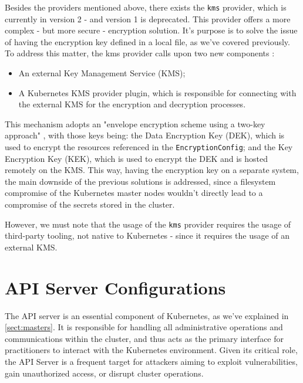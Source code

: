 \documentclass[a4paper,11pt,openright,BCOR=15mm]{scrbook}
\begin{document}
Besides the providers mentioned above, there exists the \texttt{kms} provider, which is currently in version 2 - and version 1 is deprecated. This provider offers a more complex - but more secure - encryption solution. It's purpose is to solve the issue of having the encryption key defined in a local file, as we've covered previously. To address this matter, the kms provider calls upon two new components \cite{gkatziouras_kubernetes_2024}: 

\begin{itemize}
	\item An external Key Management Service (KMS);
	\item A Kubernetes KMS provider plugin, which is responsible for connecting with the external KMS for the encryption and decryption processes.
\end{itemize}

This mechanism adopts an "envelope encryption scheme using a two-key approach" \cite{gkatziouras_kubernetes_2024}, with those keys being: the Data Encryption Key (DEK), which is used to encrypt the resources referenced in the \texttt{EncryptionConfig}; and the Key Encryption Key (KEK), which is used to encrypt the DEK and is hosted remotely on the KMS. This way, having the encryption key on a separate system, the main downside of the previous solutions is addressed, since a filesystem compromise of the Kubernetes master nodes wouldn't directly lead to a compromise of the secrets stored in the cluster.

However, we must note that the usage of the \texttt{kms} provider requires the usage of third-party tooling, not native to Kubernetes - since it requires the usage of an external KMS. 


	\section{API Server Configurations}
	
The API server is an essential component of Kubernetes, as we've explained in \ref{sect:masters}. It is responsible for handling all administrative operations and communications within the cluster, and thus acts as the primary interface for practitioners to interact with the Kubernetes environment. Given its critical role, the API Server is a frequent target for attackers aiming to exploit vulnerabilities, gain unauthorized access, or disrupt cluster operations.
\end{document}
